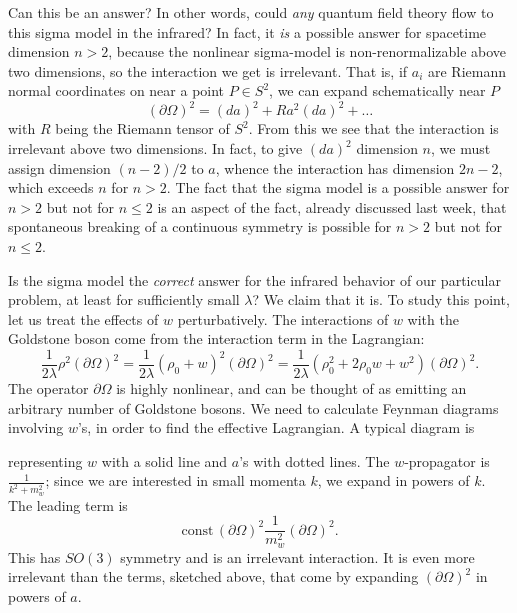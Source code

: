Can this be an answer?  In other words, could {\it any}\/ quantum field theory
flow to this sigma model in the infrared?
In fact, it {\it is}\/ a possible answer for spacetime dimension
$n>2$, because the nonlinear
sigma-model is non-renormalizable above two dimensions, so the interaction we
get is irrelevant.  That is, if $a_i$ are Riemann normal
coordinates on near a point  $P\in S^2$, we can expand
schematically near $P$
$$(\partial\Omega)^2=(da)^2+R a^2 (da)^2 +\dots$$
with $R$ being the Riemann tensor of $S^2$.
{}From this we see that the interaction is irrelevant 
 above two dimensions.  In fact, to give $(da)^2$ dimension $n$, 
 we must assign dimension $(n-2)/2$ to $a$, whence the interaction
 has dimension $2n-2$, which exceeds $n$ for $n>2$.  The fact that the
 sigma model is a possible  answer for $n>2$ but not for $n\leq 2$ is
 an aspect of the fact, already discussed last week, that spontaneous
 breaking of a continuous symmetry is possible for $n>2$ but not for 
 $n\leq 2$.

Is the sigma model the {\it correct}\/ answer for the infrared behavior
of our particular problem, at least for sufficiently small $\lambda$?  
We claim that it is.  To study this point, let us
treat the effects of $w$ perturbatively.  The interactions of $w$
with the Goldstone
boson come from the interaction term in the Lagrangian:
$$\frac1{2\lambda}\rho^2(
\partial\Omega)
^2=\frac1{2\lambda}(\rho_0+w)^2(\partial\Omega)^2= 
\frac1{2\lambda}(\rho_0^2+2\rho_0w+w^2)(\partial\Omega)^2.$$ 
The operator $\partial\Omega$ is highly nonlinear, and can be thought of as  
emitting an arbitrary number of Goldstone bosons.  We need to calculate
Feynman diagrams involving $w$'s, in order to find the effective Lagrangian.  
A typical
diagram is

\centerline{\epsfxsize=2in}
\centerline{\quad}

\noindent
representing $w$ with a solid line and $a$'s with dotted lines.  The 
$w$-propagator is $\frac1{k^2+m_w^2}$; since we are interested in small momenta
$k$, we expand in powers of $k$.  The leading term is
$$\text{const}\,(\partial\Omega)^2\frac1{m_w^2}(\partial\Omega)^2.$$
This has $SO(3)$ symmetry and is an irrelevant interaction.
It is even more irrelevant than the terms, sketched above, that
come by expanding $(\partial \Omega)^2$ in powers of $a$.


